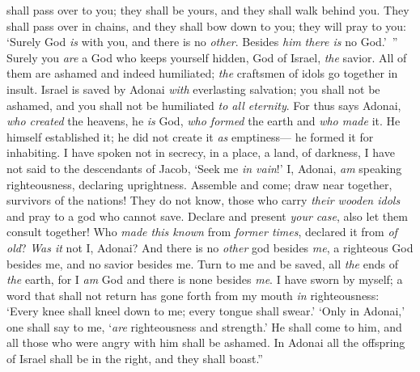 \begin{biblechapter}
shall pass over to you; 
they shall be yours, 
and they shall walk behind you. 
They shall pass over in chains, 
and they shall bow down to you; 
they will pray to you: 
‘Surely God \textit{is} with you, and there is no \textit{other}. 
Besides \textit{him} \textit{there is} no God.’ ”
\verse Surely you \textit{are} a God who keeps yourself hidden, 
God of Israel, \textit{the} savior.
\verse All of them are ashamed and indeed humiliated; 
\textit{the} craftsmen of idols go together in insult.
\verse Israel is saved by Adonai \textit{with} everlasting salvation; 
you shall not be ashamed, 
and you shall not be humiliated \textit{to all eternity}.
\verse For thus says Adonai, \textit{who created} the heavens, 
he \textit{is} God, \textit{who formed} the earth 
and \textit{who made} it. 
He himself established it; 
he did not create it \textit{as} emptiness— 
he formed it for inhabiting.
\verse I have spoken not in secrecy, in a place, a land, of darkness, 
I have not said to the descendants of Jacob, ‘Seek me \textit{in vain}!’ 
I, Adonai, \textit{am} speaking righteousness, 
declaring uprightness.
\verse Assemble and come; 
draw near together, survivors of the nations! 
They do not know, those who carry \textit{their wooden idols} 
and pray to a god who cannot save.
\verse Declare and present \textit{your case}, 
also let them consult together! 
Who \textit{made this known} from \textit{former times}, 
declared it from \textit{of old}? 
\textit{Was it} not I, Adonai? 
And there is no \textit{other} god besides \textit{me}, 
a righteous God besides me, 
and no savior besides me.
\verse Turn to me and be saved, all \textit{the} ends of \textit{the} earth, 
for I \textit{am} God and there is none besides \textit{me}.
\verse I have sworn by myself; 
a word that shall not return has gone forth from my mouth \textit{in} righteousness: 
‘Every knee shall kneel down to me; 
every tongue shall swear.’
\verse ‘Only in Adonai,’ one shall say to me, ‘\textit{are} righteousness and strength.’ 
He shall come to him, and all those who were angry with him shall be ashamed.
\verse In Adonai all the offspring of Israel shall be in the right, 
and they shall boast.”
\end{biblechapter}

